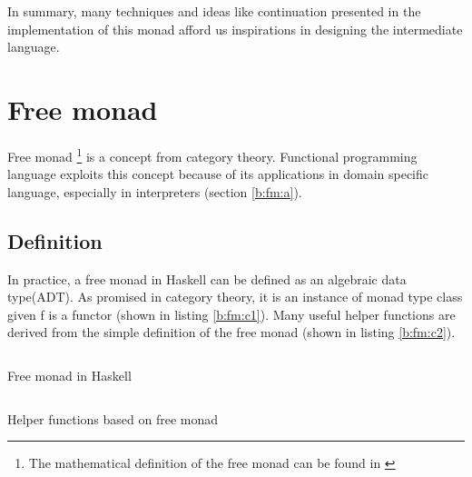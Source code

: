 In summary, many techniques and ideas like continuation presented in the implementation of this monad afford us inspirations in designing the intermediate language.
\section{Free monad} \label{b:fm}
Free monad \footnote{The mathematical definition of the free monad can be found in \cite{contributorsCatsFreeMonads}} is a concept from category theory.
Functional programming language exploits this concept because of its applications in domain specific language, especially in interpreters (section \ref{b:fm:a}).
\subsection{Definition}
In practice, a free monad in Haskell can be defined as an algebraic data type(ADT). As promised in category theory, it is an instance of monad type class given f is a functor (shown in listing \ref{b:fm:c1}). Many useful helper functions are derived from the simple definition of the free monad (shown in listing \ref{b:fm:c2}).
\begin{code}
  \inputminted{haskell}{background/fm-construction.hs}
  \caption{Free monad in Haskell}
  \label{b:fm:c1}
\end{code}
\begin{code}
  \inputminted{haskell}{background/fm-helper.hs}
  \caption{Helper functions based on free monad}
  \label{b:fm:c2}
\end{code}
